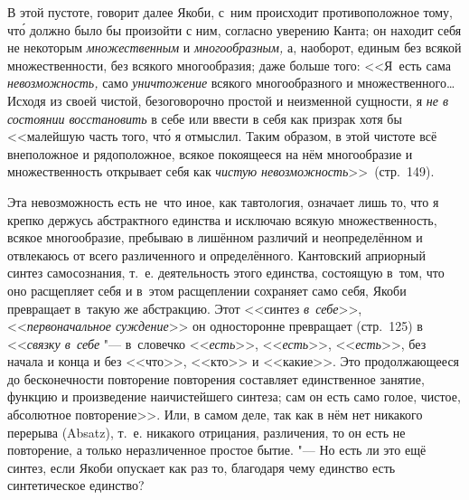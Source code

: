 В этой пустоте, говорит далее Якоби, с~ним происходит противоположное тому,
чт\'{о} должно было бы произойти с ним, согласно уверению Канта; он находит
себя не некоторым {\em множественным} и {\em многообразным,} а, наоборот,
единым без всякой множественности, без всякого многообразия; даже больше того:
<<Я~есть сама {\em невозможность,} само {\em уничтожение} всякого
многообразного и множественного\ldots Исходя из своей чистой, безоговорочно
простой и неизменной сущности, я {\em не в состоянии восстановить} в себе или
ввести в себя как призрак хотя бы <<малейшую часть того, чт\'{о} я отмыслил.
Таким образом, в этой чистоте всё внеположное и рядоположное, всякое покоящееся
на нём многообразие и множественность открывает себя как
{\em чистую невозможность}>>~(стр.~149).

Эта невозможность есть не~что иное, как тавтология, означает лишь то, что я
крепко держусь абстрактного единства и исключаю всякую множественность, всякое
многообразие, пребываю в лишённом различий и неопределённом и отвлекаюсь от
всего различенного и определённого. Кантовский априорный синтез самосознания,
т.~е. деятельность этого единства, состоящую в~том, что оно расщепляет себя и
в~этом расщеплении сохраняет само себя, Якоби превращает в~такую же абстракцию.
Этот <<синтез {\em в~себе}>>, <<{\em первоначальное суждение}>> он односторонне
превращает (стр.~125) в <<{\em связку в~себе} "--- в~словечко <<{\em есть}>>,
<<{\em есть}>>, <<{\em есть}>>, без начала и конца и без <<что>>, <<кто>> и
<<какие>>. Это продолжающееся до бесконечности повторение повторения составляет
единственное занятие, функцию и произведение наичистейшего синтеза; сам он есть
само голое, чистое, абсолютное повторение>>. Или, в самом деле, так как в нём
нет никакого перерыва (Ab\-satz), т.~е. никакого отрицания, различения, то он есть не
повторение, а только неразличенное простое бытие. "--- Но есть ли это ещё
синтез, если Якоби опускает как раз то, благодаря чему единство есть
синтетическое единство?

